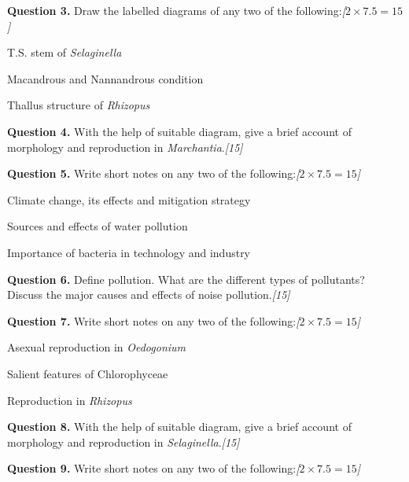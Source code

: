 \documentclass[11pt,a4paper]{article}
\newcommand{\pts}[1]{\hfill   \textit{[#1]}}
\begin{document}
\noindent   \textbf{Question 3.} Draw the labelled diagrams of any two of the following:\pts{$2  \times 7.5 = 15$}

\begin{parts}
  \item T.S. stem of   \textit{Selaginella}
  \item Macandrous and Nannandrous condition
  \item Thallus structure of   \textit{Rhizopus}
\end{parts}

\medskip


\noindent   \textbf{Question 4.} With the help of suitable diagram, give a brief account of morphology and reproduction in   \textit{Marchantia}.\pts{15}

\medskip


\noindent   \textbf{Question 5.} Write short notes on any two of the following:\pts{$2  \times 7.5 = 15$}

\begin{parts}
  \item Climate change, its effects and mitigation strategy
  \item Sources and effects of water pollution
  \item Importance of bacteria in technology and industry
\end{parts}

\medskip


\noindent   \textbf{Question 6.} Define pollution. What are the different types of pollutants? Discuss the major causes and effects of noise pollution.\pts{15}

\medskip


\noindent   \textbf{Question 7.} Write short notes on any two of the following:\pts{$2  \times 7.5 = 15$}

\begin{parts}
  \item Asexual reproduction in   \textit{Oedogonium}
  \item Salient features of Chlorophyceae
  \item Reproduction in   \textit{Rhizopus}
\end{parts}

\medskip


\noindent   \textbf{Question 8.} With the help of suitable diagram, give a brief account of morphology and reproduction in   \textit{Selaginella}.\pts{15}

\medskip


\noindent   \textbf{Question 9.} Write short notes on any two of the following:\pts{$2  \times 7.5 = 15$}
\end{document}
